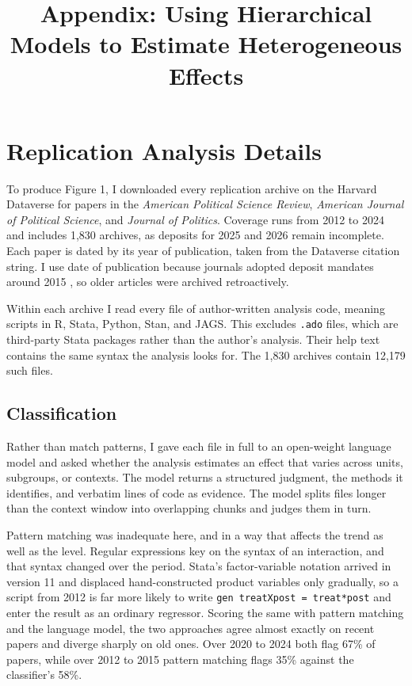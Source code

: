 \documentclass[12pt]{article}
\title{\textbf{Appendix: Using Hierarchical Models to Estimate Heterogeneous Effects}}
\date{}
\begin{document}
\maketitle 

\singlespace 

\tableofcontents

\newpage

\section{Replication Analysis Details}

To produce Figure 1, I downloaded every replication archive on the Harvard Dataverse for papers in the \textit{American Political Science Review}, \textit{American Journal of Political Science}, and \textit{Journal of Politics}.
Coverage runs from 2012 to 2024 and includes 1,830 archives, as deposits for 2025 and 2026 remain incomplete.
Each paper is dated by its year of publication, taken from the Dataverse citation string.
I use date of publication because journals adopted deposit mandates around 2015 \citep{Raineyetal2025}, so older articles were archived retroactively. 

Within each archive I read every file of author-written analysis code, meaning scripts in \textsf{R}, Stata, Python, Stan, and JAGS.
This excludes \texttt{.ado} files, which are third-party Stata packages rather than the author's analysis. 
Their help text contains the same syntax the analysis looks for.
The 1,830 archives contain 12,179 such files.


\subsection{Classification}

Rather than match patterns, I gave each file in full to an open-weight language model and asked whether the analysis estimates an effect that varies across units, subgroups, or contexts.
The model returns a structured judgment, the methods it identifies, and verbatim lines of code as evidence.
The model splits files longer than the context window into overlapping chunks and judges them in turn.

Pattern matching was inadequate here, and in a way that affects the trend as well as the level.
Regular expressions key on the syntax of an interaction, and that syntax changed over the period.
Stata's factor-variable notation arrived in version 11 and displaced hand-constructed product variables only gradually, so a script from 2012 is far more likely to write \texttt{gen treatXpost = treat*post} and enter the result as an ordinary regressor.
Scoring the same with pattern matching and the language model, the two approaches agree almost exactly on recent papers and diverge sharply on old ones. 
Over 2020 to 2024 both flag 67\% of papers, while over 2012 to 2015 pattern matching flags 35\% against the classifier's 58\%.
\end{document}
